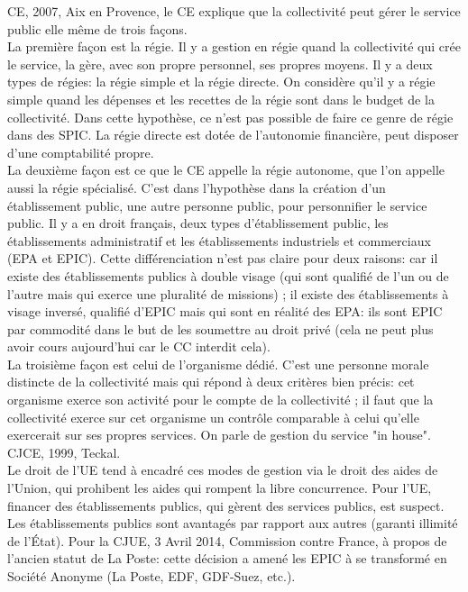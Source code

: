 \documentclass[10pt, a4paper, openany]{book}
\begin{document}
CE, 2007, Aix en Provence, le CE explique que la collectivité peut gérer le service public elle même de trois façons. \\
La première façon est la régie. Il y a gestion en régie quand la collectivité qui crée le service, la gère, avec son propre personnel, ses propres moyens. Il y a deux types de régies: la régie simple et la régie directe. On considère qu'il y a régie simple quand les dépenses et les recettes de la régie sont dans le budget de la collectivité. Dans cette hypothèse, ce n'est pas possible de faire ce genre de régie dans des SPIC. La régie directe est dotée de l'autonomie financière, peut disposer d'une comptabilité propre. \\
La deuxième façon est ce que le CE appelle la régie autonome, que l'on appelle aussi la régie spécialisé. C'est dans l'hypothèse dans la création d'un établissement public, une autre personne public, pour personnifier le service public. Il y a en droit français, deux types d'établissement public, les établissements administratif et les établissements industriels et commerciaux (EPA et EPIC). Cette différenciation n'est pas claire pour deux raisons: car il existe des établissements publics à double visage (qui sont qualifié de l'un ou de l'autre mais qui exerce une pluralité de missions) ; il existe des établissements à visage inversé, qualifié d'EPIC mais qui sont en réalité des EPA: ils sont EPIC par commodité dans le but de les soumettre au droit privé (cela ne peut plus avoir cours aujourd'hui car le CC interdit cela). \\
La troisième façon est celui de l'organisme dédié. C'est une personne morale distincte de la collectivité mais qui répond à deux critères bien précis: cet organisme exerce son activité pour le compte de la collectivité ; il faut que la collectivité exerce sur cet organisme un contrôle comparable à celui qu'elle exercerait sur ses propres services. On parle de gestion du service "in house". CJCE, 1999, Teckal. \\
Le droit de l'UE tend à encadré ces modes de gestion via le droit des aides de l'Union, qui prohibent les aides qui rompent la libre concurrence. Pour l'UE, financer des établissements publics, qui gèrent des services publics, est suspect. Les établissements publics sont avantagés par rapport aux autres (garanti illimité de l'État). Pour la CJUE, 3 Avril 2014, Commission contre France, à propos de l'ancien statut de La Poste: cette décision a amené les EPIC à se transformé en Société Anonyme (La Poste, EDF, GDF-Suez, etc.). 
\end{document}
